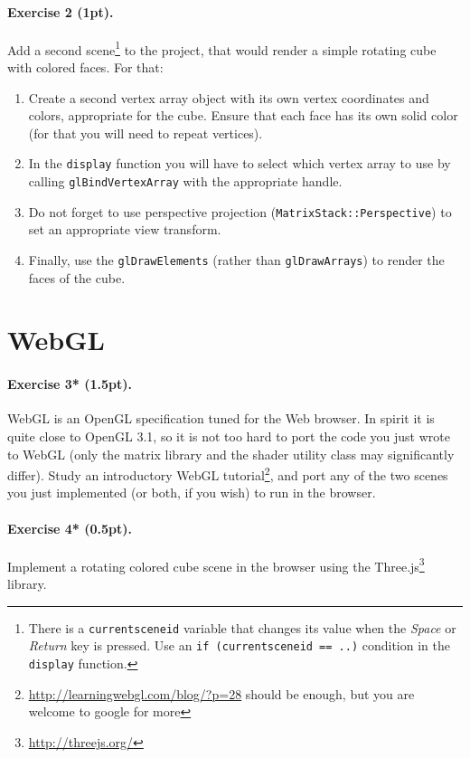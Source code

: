 \documentclass{article}
\newenvironment{exercise}[2]{\paragraph{Exercise #1 (#2pt).} }{
\medskip}
\begin{document}
\begin{exercise}{2}{1}
Add a second scene\footnote{There is a \texttt{current\textunderscore scene\textunderscore id} variable that changes its value when the \emph{Space} or \emph{Return} key is pressed. Use an \texttt{if (current\textunderscore scene\textunderscore id == ..)} condition in the \texttt{display} function.} to the project, that would render a simple rotating cube with colored faces. For that:
\begin{enumerate}
\item Create a second vertex array object with its own vertex coordinates and colors, appropriate for the cube. Ensure that each face has its own solid color (for that you will need to repeat vertices).
\item In the \texttt{display} function you will have to select which vertex array to use by calling \texttt{glBindVertexArray} with the appropriate handle.
\item Do not forget to use perspective projection (\texttt{MatrixStack::Perspective}) to set an appropriate view transform.
\item Finally, use the \verb#glDrawElements# (rather than \texttt{glDrawArrays}) to render the faces of the cube.
\end{enumerate}
\end{exercise}

\section{WebGL}
\begin{exercise}{3*}{1.5}
WebGL is an OpenGL specification tuned for the Web browser. In spirit it is quite close to OpenGL 3.1, so it is not too hard to port the code you just wrote to WebGL (only the matrix library and the shader utility class may significantly differ). Study an introductory WebGL tutorial\footnote{\url{http://learningwebgl.com/blog/?p=28} should be enough, but you are welcome to google for more}, and port any of the two scenes you just implemented (or both, if you wish) to run in the browser.
\end{exercise}

\begin{exercise}{4*}{0.5}
Implement a rotating colored cube scene in the browser using the Three.js\footnote{\url{http://threejs.org/}} library.
\end{exercise}
\end{document}
